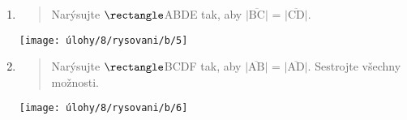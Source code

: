 \begin{enumerate}
    \item
    \begin{minipage}[t]{\linewidth}
        \begin{quote}
            Narýsujte $\rectangle$ABDE tak, aby $\lvert \overline{\text{BC}} \rvert$ = $\lvert \overline{\text{CD}} \rvert$.
        \end{quote}
        \centering
        \texttt{[image: úlohy/8/rysovani/b/5]}

    \end{minipage}

    \item
    \begin{minipage}[t]{\linewidth}
        \begin{quote}
            Narýsujte $\rectangle$BCDF tak, aby $\lvert \overline{\text{AB}} \rvert$ = $\lvert \overline{\text{AD}} \rvert$.
            Sestrojte všechny možnosti.
        \end{quote}
        \centering
        \texttt{[image: úlohy/8/rysovani/b/6]}

    \end{minipage}
\end{enumerate}


\newpage

